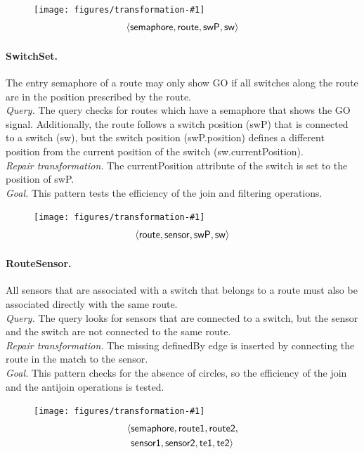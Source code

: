 \documentclass[submission,copyright,creativecommons]{eptcs}
\newcommand{\tuple}[1]{\langle #1 \rangle}
\newcommand{\ttctransformation}[2]{
	\begin{figure}
		\centering
		\vspace{-1em}
		\texttt{[image: figures/transformation-\#1]}
		\vspace{-1em}
		\footnotesize
		\begin{align*}
		\sf #2
		\end{align*}
		\vspace{-3em}
	\end{figure}
}
\begin{document}
\ttctransformation{switchset}{\tuple{semaphore, route, swP, sw}}
\paragraph{SwitchSet.} The entry semaphore of a route may only show GO if all switches along the route are in the position prescribed by the route. \\
\textit{Query.} The query checks for routes which have a semaphore that shows the GO signal. Additionally, the route follows a switch position (\textsf{swP}) that is connected to a switch (\textsf{sw}), but the switch position (\textsf{swP.position}) defines a different position from the current position of the switch (\textsf{sw.currentPosition}). \\
\textit{Repair transformation.} The \textsf{currentPosition} attribute of the \textsf{switch} is set to the \textsf{position} of \textsf{swP}. \\
\textit{Goal.} This pattern tests the efficiency of the join and filtering operations.

\ttctransformation{routesensor}{\tuple{route, sensor, swP, sw}}
\paragraph{RouteSensor.} All sensors that are associated with a switch that belongs to a route must also be associated directly with the same route. \\
\textit{Query.} The query looks for sensors that are connected to a switch, but the sensor and the switch are not connected to the same route. \\
\textit{Repair transformation.} The missing \textsf{definedBy} edge is inserted by connecting the \textsf{route} in the match to the \textsf{sensor}. \\
\textit{Goal.} This pattern checks for the absence of circles, so the efficiency of the join and the antijoin operations is tested.

\ttctransformation{semaphoreneighbor}{\langle & \sf semaphore, route1, route2, \\ & \sf sensor1, sensor2, te1, te2 \rangle}
\end{document}
